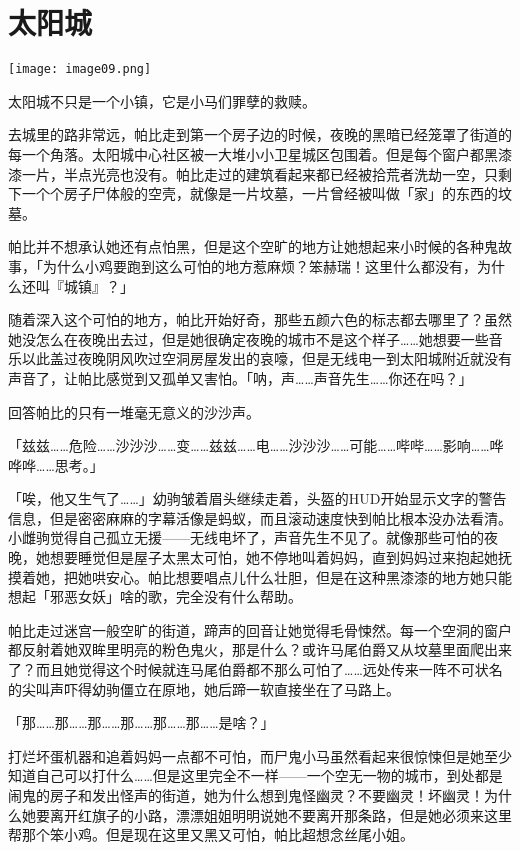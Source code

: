 \chapter{太阳城}

\texttt{[image: image09.png]}

\begin{intro}
太阳城不只是一个小镇，它是小马们罪孽的救赎。
\end{intro}


去城里的路非常远，帕比走到第一个房子边的时候，夜晚的黑暗已经笼罩了街道的每一个角落。太阳城中心社区被一大堆小小卫星城区包围着。但是每个窗户都黑漆漆一片，半点光亮也没有。帕比走过的建筑看起来都已经被拾荒者洗劫一空，只剩下一个个房子尸体般的空壳，就像是一片坟墓，一片曾经被叫做「家」的东西的坟墓。

帕比并不想承认她还有点怕黑，但是这个空旷的地方让她想起来小时候的各种鬼故事，「为什么小鸡要跑到这么可怕的地方惹麻烦？笨赫瑞！这里什么都没有，为什么还叫『城镇』？」

随着深入这个可怕的地方，帕比开始好奇，那些五颜六色的标志都去哪里了？虽然她没怎么在夜晚出去过，但是她很确定夜晚的城市不是这个样子……她想要一些音乐以此盖过夜晚阴风吹过空洞房屋发出的哀嚎，但是无线电一到太阳城附近就没有声音了，让帕比感觉到又孤单又害怕。「呐，声……声音先生……你还在吗？」

回答帕比的只有一堆毫无意义的沙沙声。

「{\mt 兹兹……危险……沙沙沙……变……兹兹……电……沙沙沙……可能……哔哔……影响……哗哗哗……思考。}」

「唉，他又生气了……」幼驹皱着眉头继续走着，头盔的HUD开始显示文字的警告信息，但是密密麻麻的字幕活像是蚂蚁，而且滚动速度快到帕比根本没办法看清。小雌驹觉得自己孤立无援——无线电坏了，声音先生不见了。就像那些可怕的夜晚，她想要睡觉但是屋子太黑太可怕，她不停地叫着妈妈，直到妈妈过来抱起她抚摸着她，把她哄安心。帕比想要唱点儿什么壮胆，但是在这种黑漆漆的地方她只能想起「邪恶女妖」啥的歌，完全没有什么帮助。

帕比走过迷宫一般空旷的街道，蹄声的回音让她觉得毛骨悚然。每一个空洞的窗户都反射着她双眸里明亮的粉色鬼火，那是什么？或许马尾伯爵又从坟墓里面爬出来了？而且她觉得这个时候就连马尾伯爵都不那么可怕了……远处传来一阵不可状名的尖叫声吓得幼驹僵立在原地，她后蹄一软直接坐在了马路上。

「那……那……那……那……那……那……是啥？」

打烂坏蛋机器和追着妈妈一点都不可怕，而尸鬼小马虽然看起来很惊悚但是她至少知道自己可以打什么……但是这里完全不一样——一个空无一物的城市，到处都是闹鬼的房子和发出怪声的街道，她为什么想到鬼怪幽灵？不要幽灵！坏幽灵！为什么她要离开红旗子的小路，漂漂姐姐明明说她不要离开那条路，但是她必须来这里帮那个笨小鸡。但是现在这里又黑又可怕，帕比超想念丝尾小姐。

